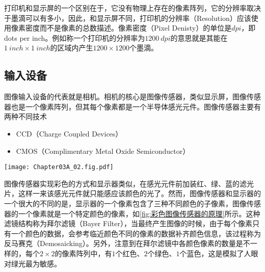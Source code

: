 打印机和显示屏的一个区别在于，它没有物理上存在的像素阵列，它的分辨率取决于墨滴可以有多小，因此，和显示屏不同，打印机的分辨率（Resolution）应该使用像素密度而不是像素的总数描述。像素密度（Pixel Denisty）的单位是$\si{dpi}$，即dots per inch。例如称一个打印机的分辨率为$\SI{1200}{dpi}$的意思就是其能在$\SI{1}{inch}\times\SI{1}{inch}$的区域内产生$1200\times 1200$个墨滴。

\subsection{输入设备}
图像输入设备的代表就是相机。相机的核心是图像传感器，类似显示屏，图像传感器也是一个像素阵列，但其每个像素都是一个半导体感光元件。图像传感器主要有两种不同技术
\begin{itemize}
    \item CCD（Charge Coupled Devices）
    \item CMOS（Complimentary Metal Oxide Semiconductor）
\end{itemize}
\begin{Figure}[彩色图像传感器的原理]
    \texttt{[image: Chapter03A\_02.fig.pdf]}
\end{Figure}
图像传感器实现彩色的方式和显示器类似，在感光元件前加装红、绿、蓝的滤光片，这样一来该感光元件就只能感应该颜色的光了。然而，图像传感器和显示器的一个很大的不同的是，显示器的一个像素包含了三种不同颜色的子像素，图像传感器的一个像素就是一个特定颜色的像素，如\cref{fig:彩色图像传感器的原理}所示。这种滤镜结构称为拜尔滤镜（Bayer Filter），当最终产生图像的时候，由于每个像素只有一个颜色的数据，会参考临近颜色不同的像素的数据补齐颜色信息，该过程称为反马赛克（Demosaicking）。另外，注意到在拜尔滤镜中各颜色像素的数量是不一样的，每个$2\times 2$的像素阵列中，有$1$个红色、$2$个绿色、$1$个蓝色，这是模拟了人眼对绿光最为敏感。
